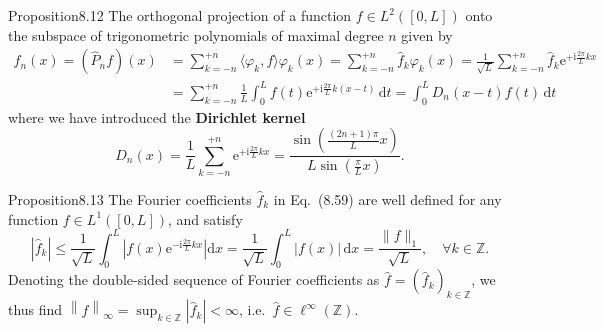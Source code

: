 \begin{res}{Proposition}{8.12}
The orthogonal projection of a function $f\in L^2([0,L])$ onto the subspace of trigonometric polynomials of maximal degree $n$ given by
\begin{align}
f_n(x)=(\hat P_nf)(x)&=\sum_{k=-n}^{+n}\langle\varphi_k,f\rangle\varphi_k(x)=\sum_{k=-n}^{+n}\widehat f_k\varphi_k(x)=\frac1{\sqrt L}\sum_{k=-n}^{+n}\widehat f_k\mathrm e^{+\mathrm i\frac{2\pi}{L}kx}\tag{8.60}\\
&=\sum_{k=-n}^{+n}\frac1L\int_0^Lf(t)\mathrm e^{+\mathrm i\frac{2\pi}{L}k(x-t)}\,\mathrm dt=\int_0^LD_n(x-t)f(t)\,\mathrm dt\tag{8.61}
\end{align}
where we have introduced the \textbf{Dirichlet kernel}
\begin{equation}D_n(x)=\frac1L\sum_{k=-n}^{+n}\mathrm e^{+\mathrm i\frac{2\pi}{L}kx}=\frac{\sin\left(\frac{(2n+1)\pi}{L}x\right)}{L\sin\left(\frac\pi Lx\right)}.\tag{8.62}\end{equation}
\end{res}

\begin{res}{Proposition}{8.13}
The Fourier coefficients $\widehat f_k$ in Eq.~(8.59) are well defined for any function $f\in L^1([0,L])$, and satisfy
\begin{equation}\left|\widehat f_k\right|\le\frac1{\sqrt L}\int_0^L\left|f(x)\mathrm e^{-\mathrm i\frac{2\pi}{L}kx}\right|\mathrm dx=\frac1{\sqrt L}\int_0^L|f(x)|\,\mathrm dx=\frac{\|f\|_1}{\sqrt L},\quad\forall k\in\mathbb Z.\tag{8.65}\end{equation}
Denoting the double-sided sequence of Fourier coefficients as $\widehat f=(\widehat f_k)_{k\in\mathbb Z}$, we thus find $\left\|\widehat f\right\|_\infty=\sup_{k\in\mathbb Z}\left|\widehat f_k\right|<\infty$, i.e.\ $\widehat f\in\ell^\infty(\mathbb Z)$.
\end{res}

